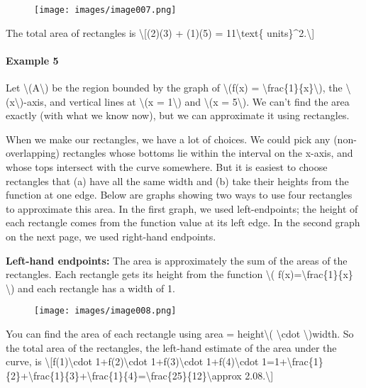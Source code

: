 \begin{figure}
\centering
\texttt{[image: images/image007.png]}
\caption{}
\end{figure}

The total area of rectangles is \textbackslash{}{[}(2)(3) + (1)(5) =
11\textbackslash{}text\{ units\}\^{}2.\textbackslash{}{]}

\hypertarget{example-5}{%
\paragraph{Example 5}\label{example-5}}

Let \textbackslash{}(A\textbackslash{}) be the region bounded by the
graph of \textbackslash{}(f(x) =
\textbackslash{}frac\{1\}\{x\}\textbackslash{}), the
\textbackslash{}(x\textbackslash{})-axis, and vertical lines at
\textbackslash{}(x = 1\textbackslash{}) and \textbackslash{}(x =
5\textbackslash{}). We can't find the area exactly (with what we know
now), but we can approximate it using rectangles.

When we make our rectangles, we have a lot of choices. We could pick any
(non-overlapping) rectangles whose bottoms lie within the interval on
the x-axis, and whose tops intersect with the curve somewhere. But it is
easiest to choose rectangles that (a) have all the same width and (b)
take their heights from the function at one edge. Below are graphs
showing two ways to use four rectangles to approximate this area. In the
first graph, we used left-endpoints; the height of each rectangle comes
from the function value at its left edge. In the second graph on the
next page, we used right-hand endpoints.

\textbf{Left-hand endpoints:} The area is approximately the sum of the
areas of the rectangles. Each rectangle gets its height from the
function \textbackslash{}( f(x)=\textbackslash{}frac\{1\}\{x\}
\textbackslash{}) and each rectangle has a width of 1.

\begin{figure}
\centering
\texttt{[image: images/image008.png]}
\caption{}
\end{figure}

You can find the area of each rectangle using area =
height\textbackslash{}( \textbackslash{}cdot \textbackslash{})width. So
the total area of the rectangles, the left-hand estimate of the area
under the curve, is \textbackslash{}{[}f(1)\textbackslash{}cdot
1+f(2)\textbackslash{}cdot 1+f(3)\textbackslash{}cdot
1+f(4)\textbackslash{}cdot
1=1+\textbackslash{}frac\{1\}\{2\}+\textbackslash{}frac\{1\}\{3\}+\textbackslash{}frac\{1\}\{4\}=\textbackslash{}frac\{25\}\{12\}\textbackslash{}approx
2.08.\textbackslash{}{]}

